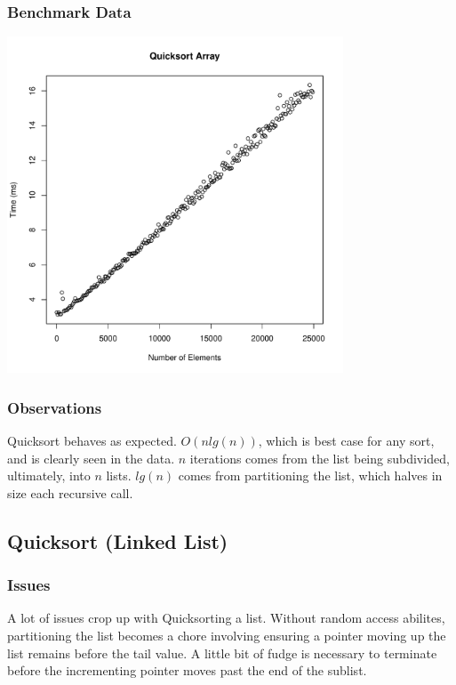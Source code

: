 \documentclass[a4paper,12pt]{article}
\begin{document}
\subsubsection{Benchmark Data}
\includegraphics[height=10cm]{quicksort_array}
\subsubsection{Observations}
Quicksort behaves as expected. $O(nlg(n))$, which is best case for any sort, and is clearly seen in the data.
$n$ iterations comes from the list being subdivided, ultimately, into $n$ lists. $lg(n)$ comes from partitioning the list, which
halves in size each recursive call.
\subsection{Quicksort (Linked List)}
\subsubsection{Issues}
A lot of issues crop up with Quicksorting a list. Without random access abilites, partitioning the list becomes a chore
involving ensuring a pointer moving up the list remains before the tail value. A little bit of fudge is necessary to
terminate before the incrementing pointer moves past the end of the sublist.
\end{document}
